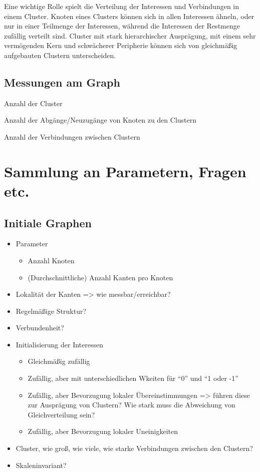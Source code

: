 \documentclass[11pt, a4paper]{scrartcl}
\begin{document}
Eine wichtige Rolle spielt die Verteilung der Interessen und Verbindungen in einem Cluster. Knoten eines Clusters können sich in allen Interessen ähneln, oder nur in einer Teilmenge der Interessen, während die Interessen der Restmenge zufällig verteilt sind. Cluster mit stark hierarchischer Ausprägung, mit einem sehr vermögenden Kern und schwächerer Peripherie können sich von gleichmäßig aufgebauten Clustern unterscheiden.

\subsection{Messungen am Graph}
Anzahl der Cluster

Anzahl der Abgänge/Neuzugänge von Knoten zu den Clustern

Anzahl der Verbindungen zwischen Clustern

\printbibliography

\appendix
\section{Sammlung an Parametern, Fragen etc.}
\subsection{Initiale Graphen}
\begin{itemize}
\item Parameter\begin{itemize}
	\item Anzahl Knoten
	\item (Durchschnittliche) Anzahl Kanten pro Knoten
\end{itemize}
\item Lokalität der Kanten => wie messbar/erreichbar?
\item Regelmäßige Struktur?
\item Verbundenheit?
\item Initialisierung der Interessen\begin{itemize}
	\item Gleichmäßig zufällig
	\item Zufällig, aber mit unterschiedlichen Wkeiten für "`0"' und "`1 oder -1"'
	\item Zufällig, aber Bevorzugung lokaler Übereinstimmungen => führen diese zur Ausprägung von Clustern? Wie stark muss die Abweichung von Gleichverteilung sein?
	\item Zufällig, aber Bevorzugung lokaler Uneinigkeiten
\end{itemize}
\item Cluster, wie groß, wie viele, wie starke Verbindungen zwischen den Clustern?
\item Skaleninvariant?
\end{itemize}
\end{document}

